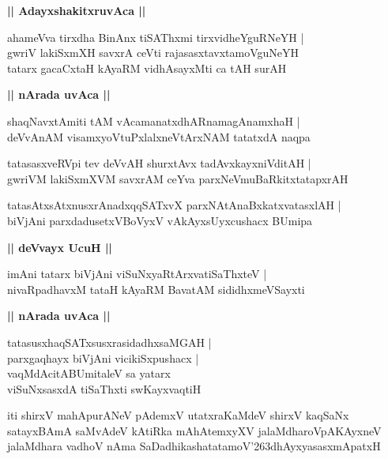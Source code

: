 \documentclass[twoside,12pt,openright]{book}
\def\S{\char'263}
\newcounter{shloka}[chapter]
\def\uvaca#1{\centerline{{\large\textbf{#1}}}}
\begin{document}
\uvaca{|| AdayxshakitxruvAca ||}

\begin{shloka}%
ahameVva tirxdha BinAnx tiSAThxmi tirxvidheYguRNeYH |\\
gwriV lakiSxmXH savxrA ceVti rajasasxtavxtamoVguNeYH \\
tatarx gacaCxtaH kAyaRM vidhAsayxMti ca tAH surAH 
\end{shloka}

\uvaca{|| nArada uvAca ||}

\begin{shloka}%
shaqNavxtAmiti tAM vAcamanatxdhARnamagAnamxhaH |\\
deVvAnAM visamxyoVtuPxlalxneVtArxNAM tatatxdA naqpa 
\end{shloka}

\begin{shloka}%
tatasasxveRVpi tev deVvAH shurxtAvx tadAvxkayxniVditAH |\\
gwriVM lakiSxmXVM savxrAM ceYva parxNeVmuBaRkitxtatapxrAH 
\end{shloka}

\begin{shloka}%
tatasAtxsAtxnusxrAnadxqqSATxvX parxNAtAnaBxkatxvatasxlAH |\\
biVjAni parxdadusetxVBoVyxV vAkAyxsUyxcushacx BUmipa 
\end{shloka}

\uvaca{|| deVvayx UcuH ||}

\begin{shloka}%
imAni tatarx biVjAni viSuNxyaRtArxvatiSaThxteV |\\
nivaRpadhavxM tataH kAyaRM BavatAM sididhxmeVSayxti 
\end{shloka}

\uvaca{|| nArada uvAca ||}

\begin{shloka}%
tatasusxhaqSATxsusxrasidadhxsaMGAH |\\
parxgaqhayx biVjAni vicikiSxpushacx |\\
vaqMdAcitABUmitaleV sa yatarx \\
viSuNxsasxdA tiSaThxti swKayxvaqtiH
\end{shloka}

\begin{center}
iti shirxV mahApurANeV pAdemxV utatxraKaMdeV shirxV kaqSaNx satayxBAmA saMvAdeV kAtiRka 
mAhAtemxyXV jalaMdharoVpAKAyxneV jalaMdhara vadhoV nAma SaDadhikashatatamoV\S dhAyxyasasxmApatxH 
\end{center}
\end{document}
